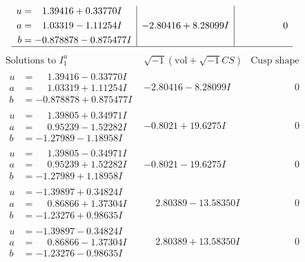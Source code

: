 \documentclass[1p]{elsarticle_modified}
\theoremstyle{definition}
\newcommand{\I}{\sqrt{-1}}
\begin{document}
$$\begin{array}{c|c|c}
\begin{aligned}
u &= \phantom{-}1.39416 + 0.33770 I \\
a &= \phantom{-}1.03319 - 1.11254 I \\
b &= -0.878878 - 0.875477 I\end{aligned}
 & -2.80416 + 8.28099 I & \phantom{-0.000000 } 0\\
 \hline 
 \end{array}$$\newpage$$\begin{array}{c|c|c}  
\text{Solutions to }I^u_{1}& \I (\text{vol} + \sqrt{-1}CS) & \text{Cusp shape}\\
 \hline 
\begin{aligned}
u &= \phantom{-}1.39416 - 0.33770 I \\
a &= \phantom{-}1.03319 + 1.11254 I \\
b &= -0.878878 + 0.875477 I\end{aligned}
 & -2.80416 - 8.28099 I & \phantom{-0.000000 } 0 \\ \hline\begin{aligned}
u &= \phantom{-}1.39805 + 0.34971 I \\
a &= \phantom{-}0.95239 - 1.52282 I \\
b &= -1.27989 - 1.18958 I\end{aligned}
 & -0.8021 + 19.6275 I & \phantom{-0.000000 } 0 \\ \hline\begin{aligned}
u &= \phantom{-}1.39805 - 0.34971 I \\
a &= \phantom{-}0.95239 + 1.52282 I \\
b &= -1.27989 + 1.18958 I\end{aligned}
 & -0.8021 - 19.6275 I & \phantom{-0.000000 } 0 \\ \hline\begin{aligned}
u &= -1.39897 + 0.34824 I \\
a &= \phantom{-}0.86866 + 1.37304 I \\
b &= -1.23276 + 0.98635 I\end{aligned}
 & \phantom{-}2.80389 - 13.58350 I & \phantom{-0.000000 } 0 \\ \hline\begin{aligned}
u &= -1.39897 - 0.34824 I \\
a &= \phantom{-}0.86866 - 1.37304 I \\
b &= -1.23276 - 0.98635 I\end{aligned}
 & \phantom{-}2.80389 + 13.58350 I & \phantom{-0.000000 } 0 \\ \hline\begin{aligned}

\end{aligned}
\end{array}$$
\end{document}
